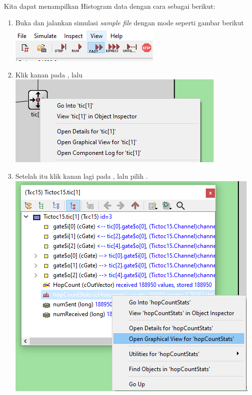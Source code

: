 \documentclass[conference]{IEEEtran}
\begin{document}
Kita dapat menampilkan Histogram data dengan cara sebagai berikut:
\begin{enumerate}
  \item Buka dan jalankan simulasi \textit{sample file}  dengan mode  seperti gambar berikut\break
        \includegraphics[scale=0.8]{images/fast-mode-button.png}

  \item Klik kanan pada , lalu \break
        \includegraphics[scale=0.53]{images/tic[1].png}

  \item Setelah itu klik kanan lagi pada , lalu pilih .\break
        \includegraphics[scale=0.5]{images/tic[1]-histogram.png}. \break


\end{enumerate}
\end{document}
